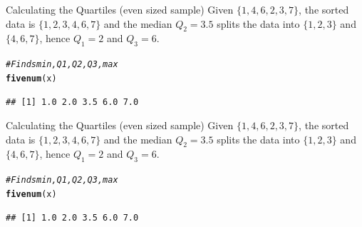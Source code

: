 \documentclass[t,xcolor=pdftex,dvipsnames,table]{beamer}\usepackage[]{graphicx}\usepackage[]{color}
\makeatletter
\newcommand{\hlcom}[1]{\textcolor[rgb]{0.678,0.584,0.686}{\textit{#1}}}%
\newcommand{\hlstd}[1]{\textcolor[rgb]{0.345,0.345,0.345}{#1}}%
\newcommand{\hlkwd}[1]{\textcolor[rgb]{0.737,0.353,0.396}{\textbf{#1}}}%
\newenvironment{kframe}{%
 \def\at@end@of@kframe{}%
 \ifinner\ifhmode%
  \def\at@end@of@kframe{\end{minipage}}%
  \begin{minipage}{\columnwidth}%
 \fi\fi%
 \def\FrameCommand##1{\hskip\@totalleftmargin \hskip-\fboxsep
 \colorbox{shadecolor}{##1}\hskip-\fboxsep
     \hskip-\linewidth \hskip-\@totalleftmargin \hskip\columnwidth}%
 \MakeFramed {\advance\hsize-\width
   \@totalleftmargin\z@ \linewidth\hsize
   \@setminipage}}%
 {\par\unskip\endMakeFramed%
 \at@end@of@kframe}
\newenvironment{knitrout}{}{} %
\makeatother
\begin{document}
\begin{frame}[fragile]{}
\begin{block}{Calculating the Quartiles (even sized sample)}
Given $\{ 1,4,6,2,3,7\}$, the sorted data is $\{ 1,2,3,4,6,7 \}$ and the median $Q_{2} = 3.5$ splits the data into $\{ 1,2,3 \}$ and $\{ 4,6,7 \}$, hence $Q_{1} = 2$ and $Q_{3} = 6$.
\end{block}

\begin{knitrout}
\color{fgcolor}\begin{kframe}
\begin{alltt}
\hlcom{# Finds min, Q1, Q2, Q3, max}
\hlkwd{fivenum}\hlstd{(x)}
\end{alltt}
\begin{verbatim}
## [1] 1.0 2.0 3.5 6.0 7.0
\end{verbatim}
\end{kframe}
\end{knitrout}
\end{frame}

\begin{frame}[fragile]{}
\begin{block}{Calculating the Quartiles (even sized sample)}
Given $\{ 1,4,6,2,3,7\}$, the sorted data is $\{ 1,2,3,4,6,7 \}$ and the median $Q_{2} = 3.5$ splits the data into $\{ 1,2,3 \}$ and $\{ 4,6,7 \}$, hence $Q_{1} = 2$ and $Q_{3} = 6$.
\end{block}

\begin{knitrout}
\color{fgcolor}\begin{kframe}
\begin{alltt}
\hlcom{# Finds min, Q1, Q2, Q3, max}
\hlkwd{fivenum}\hlstd{(x)}
\end{alltt}
\begin{verbatim}
## [1] 1.0 2.0 3.5 6.0 7.0
\end{verbatim}
\end{kframe}
\end{knitrout}
\end{frame}
\end{document}
